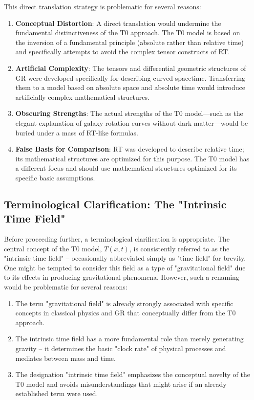 \documentclass[12pt,a4paper]{article}
\newcommand{\Tfieldt}{T(x,t)}
\begin{document}
	This direct translation strategy is problematic for several reasons:
	
	\begin{enumerate}
		\item \textbf{Conceptual Distortion}: A direct translation would undermine the fundamental distinctiveness of the T0 approach. The T0 model is based on the inversion of a fundamental principle (absolute rather than relative time) and specifically attempts to avoid the complex tensor constructs of RT.
		
		\item \textbf{Artificial Complexity}: The tensors and differential geometric structures of GR were developed specifically for describing curved spacetime. Transferring them to a model based on absolute space and absolute time would introduce artificially complex mathematical structures.
		
		\item \textbf{Obscuring Strengths}: The actual strengths of the T0 model—such as the elegant explanation of galaxy rotation curves without dark matter—would be buried under a mass of RT-like formulas.
		
		\item \textbf{False Basis for Comparison}: RT was developed to describe relative time; its mathematical structures are optimized for this purpose. The T0 model has a different focus and should use mathematical structures optimized for its specific basic assumptions.
	\end{enumerate}
	
	\subsection{Terminological Clarification: The "Intrinsic Time Field"}
	\label{subsec:terminology}
	
	Before proceeding further, a terminological clarification is appropriate. The central concept of the T0 model, $\Tfieldt$, is consistently referred to as the "intrinsic time field" – occasionally abbreviated simply as "time field" for brevity. One might be tempted to consider this field as a type of "gravitational field" due to its effects in producing gravitational phenomena. However, such a renaming would be problematic for several reasons:
	
	\begin{enumerate}
		\item The term "gravitational field" is already strongly associated with specific concepts in classical physics and GR that conceptually differ from the T0 approach.
		
		\item The intrinsic time field has a more fundamental role than merely generating gravity – it determines the basic "clock rate" of physical processes and mediates between mass and time.
		
		\item The designation "intrinsic time field" emphasizes the conceptual novelty of the T0 model and avoids misunderstandings that might arise if an already established term were used.
	\end{enumerate}
	
\end{document}
